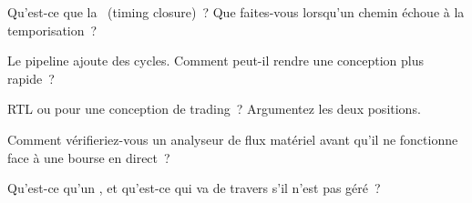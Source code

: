 \begin{interviewq}\label{iq:nw:programmable-hardware-i-architecture-and-toolchain:2}
Qu'est-ce que la ~(timing closure)~? Que faites-vous lorsqu'un chemin échoue à la temporisation~?
\end{interviewq}

\begin{interviewq}\label{iq:nw:programmable-hardware-i-architecture-and-toolchain:3}
Le pipeline ajoute des cycles. Comment peut-il rendre une conception plus rapide~?
\end{interviewq}

\begin{interviewq}\label{iq:nw:programmable-hardware-i-architecture-and-toolchain:4}
RTL ou  pour une conception de trading~? Argumentez les deux positions.
\end{interviewq}

\begin{interviewq}\label{iq:nw:programmable-hardware-i-architecture-and-toolchain:5}
Comment vérifieriez-vous un analyseur de flux matériel avant qu'il ne fonctionne face à une bourse en direct~?
\end{interviewq}

\begin{interviewq}\label{iq:nw:programmable-hardware-i-architecture-and-toolchain:6}
Qu'est-ce qu'un , et qu'est-ce qui va de travers s'il n'est pas géré~?
\end{interviewq}
